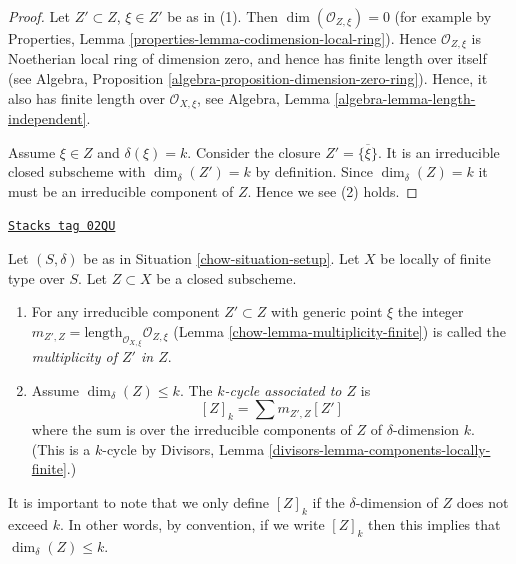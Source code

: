 \begin{proof}
Let $Z' \subset Z$, $\xi \in Z'$ be as in (1).
Then $\dim(\mathcal{O}_{Z, \xi}) = 0$ (for example by
Properties, Lemma \ref{properties-lemma-codimension-local-ring}).
Hence $\mathcal{O}_{Z, \xi}$ is Noetherian
local ring of dimension zero, and hence has finite length over
itself (see
Algebra, Proposition \ref{algebra-proposition-dimension-zero-ring}).
Hence, it also has finite length over $\mathcal{O}_{X, \xi}$, see
Algebra, Lemma \ref{algebra-lemma-length-independent}.

\medskip\noindent
Assume $\xi \in Z$ and $\delta(\xi) = k$.
Consider the closure $Z' = \overline{\{\xi\}}$. It is an irreducible
closed subscheme with $\dim_\delta(Z') = k$ by definition.
Since $\dim_\delta(Z) = k$ it must be an irreducible component
of $Z$. Hence we see (2) holds.
\end{proof}

\begin{definition}
\label{chow-definition-cycle-associated-to-closed-subscheme}
\href{https://stacks.math.columbia.edu/tag/02QU}{\texttt{Stacks tag 02QU}}

Let $(S, \delta)$ be as in Situation \ref{chow-situation-setup}.
Let $X$ be locally of finite type over $S$.
Let $Z \subset X$ be a closed subscheme.
\begin{enumerate}
\item For any irreducible component $Z' \subset Z$ with generic point $\xi$
the integer
$m_{Z', Z} = \text{length}_{\mathcal{O}_{X, \xi}} \mathcal{O}_{Z, \xi}$
(Lemma \ref{chow-lemma-multiplicity-finite})
is called the {\it multiplicity of $Z'$ in $Z$}.
\item Assume $\dim_\delta(Z) \leq k$.
The {\it $k$-cycle associated to $Z$} is
$$
[Z]_k
=
\sum m_{Z', Z}[Z']
$$
where the sum is over the irreducible components of $Z$
of $\delta$-dimension $k$. (This is a $k$-cycle by
Divisors, Lemma \ref{divisors-lemma-components-locally-finite}.)
\end{enumerate}
\end{definition}

It is important to note that we only define $[Z]_k$ if the $\delta$-dimension
of $Z$ does not exceed $k$. In other words, by convention, if we write
$[Z]_k$ then this implies that $\dim_\delta(Z) \leq k$.


